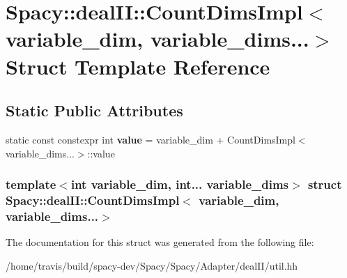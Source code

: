 \hypertarget{structSpacy_1_1dealII_1_1CountDimsImpl_3_01variable__dim_00_01variable__dims_8_8_8_4}{\section{\-Spacy\-:\-:deal\-I\-I\-:\-:\-Count\-Dims\-Impl$<$ variable\-\_\-dim, variable\-\_\-dims...$>$ \-Struct \-Template \-Reference}
\label{structSpacy_1_1dealII_1_1CountDimsImpl_3_01variable__dim_00_01variable__dims_8_8_8_4}
}
\subsection*{\-Static \-Public \-Attributes}
\begin{DoxyCompactItemize}
\item 
\hypertarget{structSpacy_1_1dealII_1_1CountDimsImpl_3_01variable__dim_00_01variable__dims_8_8_8_4_aa8976e0e85ece6ef8cf929b0e1fcb58c}{static const constexpr int {\bfseries value} = variable\-\_\-dim + \-Count\-Dims\-Impl$<$variable\-\_\-dims...$>$\-::value}\label{structSpacy_1_1dealII_1_1CountDimsImpl_3_01variable__dim_00_01variable__dims_8_8_8_4_aa8976e0e85ece6ef8cf929b0e1fcb58c}

\end{DoxyCompactItemize}
\subsubsection*{template$<$int variable\-\_\-dim, int... variable\-\_\-dims$>$ struct Spacy\-::deal\-I\-I\-::\-Count\-Dims\-Impl$<$ variable\-\_\-dim, variable\-\_\-dims...$>$}



\-The documentation for this struct was generated from the following file\-:\begin{DoxyCompactItemize}
\item 
/home/travis/build/spacy-\/dev/\-Spacy/\-Spacy/\-Adapter/deal\-I\-I/util.\-hh\end{DoxyCompactItemize}
